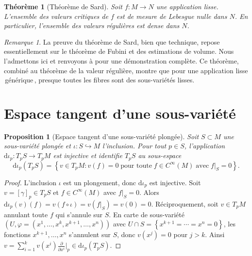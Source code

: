 \documentclass[12pt,a4paper,openany]{book}
\theoremstyle{definition}
\theoremstyle{plain}
\newtheorem{theoreme}[definition]{Théorème}
\newtheorem{proposition}[definition]{Proposition}
\theoremstyle{remark}
\newtheorem{remarque}[definition]{Remarque}
\newcommand{\dd}{\mathrm{d}}
\newcommand{\set}[1]{\left\{#1\right\}}
\providecommand{\og}{\guillemotleft\,}
\providecommand{\fg}{\,\guillemotright}
\begin{document}
\begin{theoreme}[Théorème de Sard]\label{thm:sard}
Soit $f : M \to N$ une application lisse. L'ensemble des valeurs critiques
de $f$ est de mesure de Lebesgue nulle dans $N$.
En particulier, l'ensemble des valeurs régulières est dense dans $N$.
\end{theoreme}

\begin{remarque}\label{rem:sard-utilite}
La preuve du théorème de Sard, bien que technique, repose essentiellement sur
le théorème de Fubini et des estimations de volume. Nous l'admettons ici et
renvoyons à \cite{milnor1965topology} pour une démonstration complète.
Ce théorème, combiné au théorème de la valeur régulière, montre que pour
une application lisse \og{}générique\fg{}, presque toutes les fibres sont des
sous-variétés lisses.
\end{remarque}

\section{Espace tangent d'une sous-variété}\label{sec:tangent-sous-variete}

\begin{proposition}[Espace tangent d'une sous-variété plongée]\label{prop:tangent-sous-variete}
Soit $S \subset M$ une sous-variété plongée et $\iota : S \hookrightarrow M$ l'inclusion.
Pour tout $p \in S$, l'application $\dd\iota_p : T_pS \to T_pM$ est injective et
identifie $T_pS$ au sous-espace
\[
  \dd\iota_p(T_pS) = \set{v \in T_pM : v(f) = 0 \;\text{pour toute}\; f \in C^\infty(M)
  \;\text{avec}\; f|_S = 0}.
\]
\end{proposition}

\begin{proof}
L'inclusion $\iota$ est un plongement, donc $\dd\iota_p$ est injective.
Soit $v = [\gamma]_p \in T_pS$ et $f \in C^\infty(M)$ avec $f|_S = 0$. Alors
$\dd\iota_p(v)(f) = v(f \circ \iota) = v(f|_S) = v(0) = 0$.
Réciproquement, soit $v \in T_pM$ annulant toute $f$ qui s'annule sur $S$.
En carte de sous-variété $(U, \varphi = (x^1, \ldots, x^k, x^{k+1}, \ldots, x^n))$
avec $U \cap S = \set{x^{k+1} = \cdots = x^n = 0}$, les fonctions
$x^{k+1}, \ldots, x^n$ s'annulent sur $S$, donc $v(x^j) = 0$ pour $j > k$.
Ainsi $v = \sum_{i=1}^k v(x^i) \frac{\partial}{\partial x^i}\big|_p \in \dd\iota_p(T_pS)$.
\end{proof}
\end{document}
